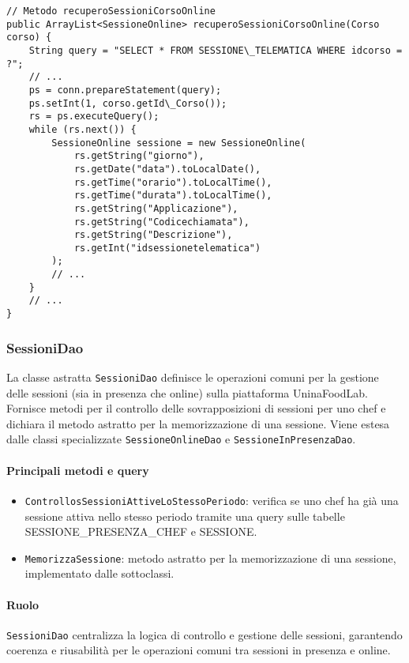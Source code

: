\begin{verbatim}
// Metodo recuperoSessioniCorsoOnline
public ArrayList<SessioneOnline> recuperoSessioniCorsoOnline(Corso corso) {
    String query = "SELECT * FROM SESSIONE\_TELEMATICA WHERE idcorso = ?";
    // ...
    ps = conn.prepareStatement(query);
    ps.setInt(1, corso.getId\_Corso());
    rs = ps.executeQuery();
    while (rs.next()) {
        SessioneOnline sessione = new SessioneOnline(
            rs.getString("giorno"),
            rs.getDate("data").toLocalDate(),
            rs.getTime("orario").toLocalTime(),
            rs.getTime("durata").toLocalTime(),
            rs.getString("Applicazione"),
            rs.getString("Codicechiamata"),
            rs.getString("Descrizione"),
            rs.getInt("idsessionetelematica")
        );
        // ...
    }
    // ...
}
\end{verbatim}

\subsubsection{SessioniDao}
La classe astratta \texttt{SessioniDao} definisce le operazioni comuni per la gestione delle sessioni (sia in presenza che online) sulla piattaforma UninaFoodLab. Fornisce metodi per il controllo delle sovrapposizioni di sessioni per uno chef e dichiara il metodo astratto per la memorizzazione di una sessione. Viene estesa dalle classi specializzate \texttt{SessioneOnlineDao} e \texttt{SessioneInPresenzaDao}.

\paragraph{Principali metodi e query}
\begin{itemize}
    \item \texttt{ControllosSessioniAttiveLoStessoPeriodo}: verifica se uno chef ha già una sessione attiva nello stesso periodo tramite una query sulle tabelle SESSIONE\_PRESENZA\_CHEF e SESSIONE.
    \item \texttt{MemorizzaSessione}: metodo astratto per la memorizzazione di una sessione, implementato dalle sottoclassi.
\end{itemize}

\paragraph{Ruolo}
\texttt{SessioniDao} centralizza la logica di controllo e gestione delle sessioni, garantendo coerenza e riusabilità per le operazioni comuni tra sessioni in presenza e online.

